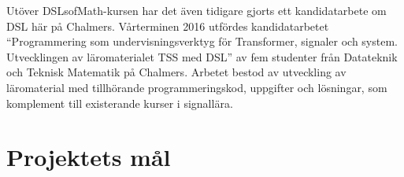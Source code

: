 \begin{draft}
Utöver DSLsofMath-kursen har det även tidigare gjorts ett kandidatarbete om DSL 
här på Chalmers. Vårterminen 2016 utfördes kandidatarbetet
``Programmering som undervisningsverktyg för Transformer, signaler och
system. Utvecklingen av läromaterialet TSS med DSL'' av fem studenter
från Datateknik och Teknisk Matematik på Chalmers. Arbetet bestod av
utveckling av läromaterial med tillhörande programmeringskod,
uppgifter och lösningar, som komplement till existerande kurser i
signallära.\cite{kandidat2016}
\end{draft}

% 

\section{Projektets mål}

